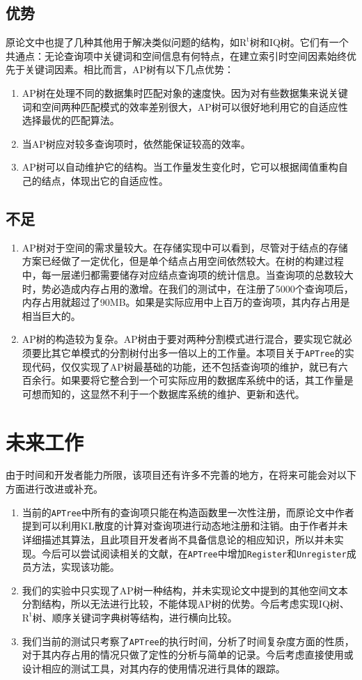 \documentclass[UTF8]{ctexart}
\begin{document}
\subsection{优势}
原论文中也提了几种其他用于解决类似问题的结构，如$\mathrm{R^t}$树和IQ树。它们有一个共通点：无论查询项中关键词和空间信息有何特点，在建立索引时空间因素始终优先于关键词因素。相比而言，AP树有以下几点优势：
\begin{enumerate}
    \item AP树在处理不同的数据集时匹配对象的速度快。因为对有些数据集来说关键词和空间两种匹配模式的效率差别很大，AP树可以很好地利用它的自适应性选择最优的匹配算法。
    \item 当AP树应对较多查询项时，依然能保证较高的效率。
    \item AP树可以自动维护它的结构。当工作量发生变化时，它可以根据阈值重构自己的结点，体现出它的自适应性。
\end{enumerate}

\subsection{不足}
\begin{enumerate}
    \item AP树对于空间的需求量较大。在存储实现中可以看到，尽管对于结点的存储方案已经做了一定优化，但是单个结点占用空间依然较大。在树的构建过程中，每一层递归都需要储存对应结点查询项的统计信息。当查询项的总数较大时，势必造成内存占用的激增。在我们的测试中，在注册了5000个查询项后，内存占用就超过了90MB。如果是实际应用中上百万的查询项，其内存占用是相当巨大的。
    \item AP树的构造较为复杂。AP树由于要对两种分割模式进行混合，要实现它就必须要比其它单模式的分割树付出多一倍以上的工作量。本项目关于\texttt{APTree}的实现代码，仅仅实现了AP树最基础的功能，还不包括查询项的维护，就已有六百余行。如果要将它整合到一个可实际应用的数据库系统中的话，其工作量是可想而知的，这显然不利于一个数据库系统的维护、更新和迭代。
\end{enumerate}

\section{未来工作}
由于时间和开发者能力所限，该项目还有许多不完善的地方，在将来可能会对以下方面进行改进或补充。
\begin{enumerate}
    \item 当前的\texttt{APTree}中所有的查询项只能在构造函数里一次性注册，而原论文中作者提到可以利用KL散度的计算对查询项进行动态地注册和注销。由于作者并未详细描述其算法，且此项目开发者尚不具备信息论的相应知识，所以并未实现。今后可以尝试阅读相关的文献，在\texttt{APTree}中增加\texttt{Register}和\texttt{Unregister}成员方法，实现该功能。
    \item 我们的实验中只实现了AP树一种结构，并未实现论文中提到的其他空间文本分割结构，所以无法进行比较，不能体现AP树的优势。今后考虑实现IQ树、$\mathrm{R^t}$树、顺序关键词字典树等结构，进行横向比较。
    \item 我们当前的测试只考察了\texttt{APTree}的执行时间，分析了时间复杂度方面的性质，对于其内存占用的情况只做了定性的分析与简单的记录。今后考虑直接使用或设计相应的测试工具，对其内存的使用情况进行具体的跟踪。
\end{enumerate}
\end{document}
